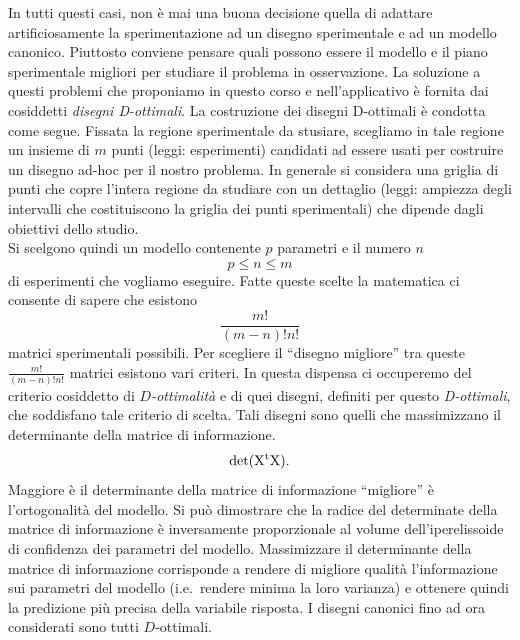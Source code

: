 \documentclass[
  11pt,
]{book}
\begin{document}
In tutti questi casi, non è mai una buona decisione quella di adattare artificiosamente la sperimentazione ad un disegno sperimentale e ad un modello canonico. Piuttosto conviene pensare quali possono essere il modello e il piano sperimentale migliori per studiare il problema in osservazione.
La soluzione a questi problemi che proponiamo in questo corso e nell'applicativo è fornita dai cosiddetti \emph{disegni D-ottimali}.
La costruzione dei disegni D-ottimali è condotta come segue.
Fissata la regione sperimentale da stusiare, scegliamo in tale regione un insieme di \(m\) punti (leggi: esperimenti) candidati ad essere usati per costruire un disegno ad-hoc per il nostro problema. In generale si considera una griglia di punti che copre l'intera regione da studiare con un dettaglio (leggi: ampiezza degli intervalli che costituiscono la griglia dei punti sperimentali) che dipende dagli obiettivi dello studio.\\
Si scelgono quindi un modello contenente \(p\) parametri e il numero \(n\)
\begin{equation*}
p \leq n \leq m
\end{equation*}
di esperimenti che vogliamo eseguire. Fatte queste scelte la matematica ci consente di sapere che esistono
\begin{equation*}
\frac{m!}{(m-n)!n!}
\end{equation*}
matrici sperimentali possibili. Per scegliere il ``disegno migliore'' tra queste \(\frac{m!}{(m-n)!n!}\) matrici esistono vari criteri. In questa dispensa ci occuperemo del criterio cosiddetto di \emph{\(D\)-ottimalità} e di quei disegni, definiti per questo \emph{D-ottimali}, che soddisfano tale criterio di scelta. Tali disegni sono quelli che massimizzano il determinante della matrice di informazione.
\begin{equation*}
\rm{det}(X^tX).
\end{equation*}
Maggiore è il determinante della matrice di informazione ``migliore'' è l'ortogonalità del modello. Si può dimostrare che la radice del determinate della matrice di informazione è inversamente proporzionale al volume dell'iperelissoide di confidenza dei parametri del modello. Massimizzare il determinante della matrice di informazione corrisponde a rendere di migliore qualità l'informazione sui parametri del modello (i.e.~rendere minima la loro varianza) e ottenere quindi la predizione più precisa della variabile risposta.\newline
I disegni canonici fino ad ora considerati sono tutti \(D\)-ottimali.
\end{document}
